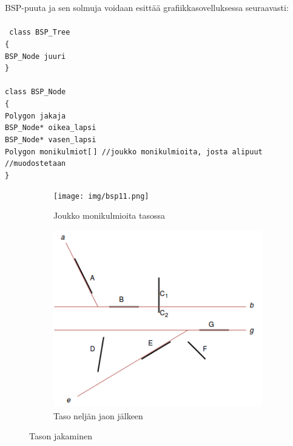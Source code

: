 \documentclass[a4paper, 12pt, titlepage]{article}
\newcommand{\tab}[1][0.5cm]{\hspace*{#1}} %
\newcommand{\code}[1]{\small\texttt{#1}} %
\begin{document}
BSP-puuta ja sen solmuja voidaan esittää grafiikkasovelluksessa seuraavasti:\\\\%
\code{
class BSP\_Tree\\
\{\\
\tab BSP\_Node juuri\\
\}\\\\
class BSP\_Node\\
\{\\
\tab Polygon jakaja\\
\tab BSP\_Node* oikea\_lapsi\\
\tab BSP\_Node* vasen\_lapsi\\
\tab Polygon monikulmiot[$\,$] \tab //joukko monikulmioita, josta alipuut\\ 
\hspace*{5.2cm} //muodostetaan\\
\}\\}

\newpage

\vspace{-0.5cm}

\begin{figure}
 \centering
 \begin{subfigure}{0.5\textwidth} 
  \centering
  \texttt{[image: img/bsp11.png]}
  \vspace{0.75cm}
  \caption{Joukko monikulmioita tasossa}
  \label{bsp11}
 \end{subfigure}%
 \begin{subfigure}{0.5\textwidth} 
  \centering
  \includegraphics[width=0.9\linewidth]{img/bsp12.png}
  \caption{Taso neljän jaon jälkeen}
  \label{bsp12}
 \end{subfigure}
 \caption{Tason jakaminen}
 \vspace{-0.5cm}
 \label{bsp1}
\end{figure}
\end{document}
